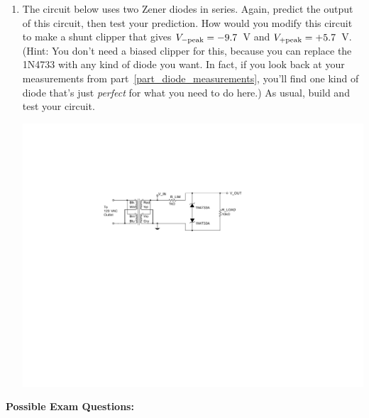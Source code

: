 \begin{enumerate}[wide]
\item The circuit below uses two Zener diodes in series.  Again, predict the output of this circuit, then test your prediction.  How would you modify this circuit to make a shunt clipper that gives $V_{-{\rm peak}} = -9.7$~V and $V_{+{\rm peak}} = +5.7$~V.   (Hint: You don't need a biased clipper for this, because you can replace the 1N4733 with any kind of diode you want.  In fact, if you look back at your measurements from part~\ref{part_diode_measurements}, you'll find one kind of diode that's just \textit{perfect} for what you need to do here.)  As usual, build and test your circuit. \label{part_double_zener_shunt_clipper}
\begin{center}
\includegraphics{diodes/double_zener_shunt_clipper.pdf}
\end{center} 
 
\end{enumerate}



\textbf{Possible Exam Questions:}

